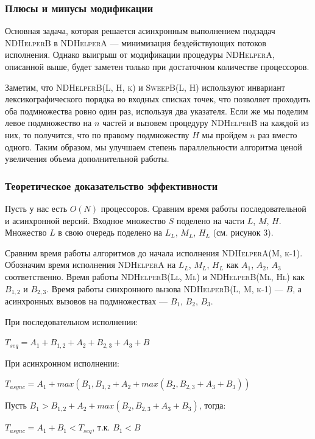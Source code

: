 \subsubsection{Плюсы и минусы модификации}
Основная задача, которая решается асинхронным выполнением подзадач \textsc{NDHelperB} в \textsc{NDHelperA} --- минимизация бездействующих потоков исполнения.
Однако выигрыш от модификации процедуры \textsc{NDHelperA}, описанной выше, будет заметен только при достаточном количестве процессоров.

Заметим, что \textsc{NDHelperB(L, H, k)} и \textsc{SweepB(L, H)} используют инвариант лексикографического порядка во входных списках точек, что позволяет проходить оба подмножества ровно один раз, используя два указателя.
Если же мы поделим левое подмножество на $n$ частей и вызовем процедуру \textsc{NDHelperB} на каждой из них, то получится, что по правому подмножеству $H$ мы пройдем $n$ раз вместо одного. Таким образом, мы улучшаем степень параллельности алгоритма ценой увеличения объема дополнительной работы.

\subsubsection{Теоретическое доказательство эффективности}
Пусть у нас есть $O(N)$ процессоров. Сравним время работы последовательной и асинхронной версий.
Входное множество $S$ поделено на части $L$, $M$, $H$. Множество $L$ в свою очередь поделено на $L_L$, $M_L$, $H_L$ (см. рисунок 3).

Сравним время работы алгоритмов до начала исполнения \textsc{NDHelperA(M, k-1)}.
Обозначим время исполнения \textsc{NDHelperA} на $L_L$, $M_L$, $H_L$ как $A_1$, $A_2$, $A_3$ соответственно.
Время работы \textsc{NDHelperB(Ll, Ml)} и \textsc{NDHelperB(Ml, Hl)} как $B_{1,2}$ и $B_{2,3}$.
Время работы синхронного вызова \textsc{NDHelperB(L, M, k-1)} --- $B$, а асинхронных вызовов на подмножествах --- $B_1$, $B_2$, $B_3$.

При последовательном исполнении:
\begin{center}
    $T_{seq} = A_1 + B_{1,2} + A_2 + B_{2,3} + A_3 + B$
\end{center}

При асинхронном исполнении:
\begin{center}
    $T_{async} = A_1 + max(B_1, B_{1,2} + A_2 + max(B_2, B_{2,3} + A_3 + B_3))$\\
\end{center}

Пусть $B_1 > B_{1,2} + A_2 + max(B_2, B_{2,3} + A_3 + B_3)$, тогда:
\begin{center}
    $T_{async} = A_1 + B_1 < T_{seq}$, т.к. $B_1 < B$
\end{center}

